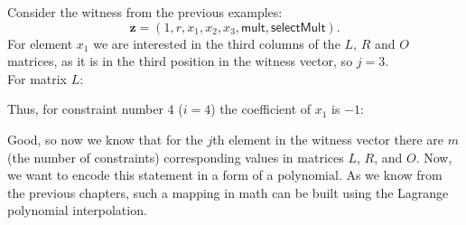 \documentclass[../../book.tex]{subfiles}
\begin{document}
\begin{example}
    Consider the witness from the previous examples: 
    \begin{equation*}
        \mathbf{z} = (1, r, x_1, x_2, x_3, \mathsf{mult}, \mathsf{selectMult}).
    \end{equation*}
    For element $x_1$ we are interested in the third columns of the $L$, $R$ and $O$ matrices, as
    it is in the third position in the witness vector, so $j = 3$.\\
    For matrix $L$:
    \begin{center}
    \end{center}

    Thus, for constraint number 4 ($i = 4$) the coefficient of $x_1$ is $-1$:
    \begin{center}
    \end{center}
\end{example}
Good, so now we know that for the $j$th element in the witness vector there are $m$ (the number of constraints) corresponding values in matrices $L$, $R$, and $O$. Now, we want to encode this statement in a form of a polynomial. 
As we know from the previous chapters, such a mapping in math can be built using the Lagrange polynomial interpolation.
\end{document}
